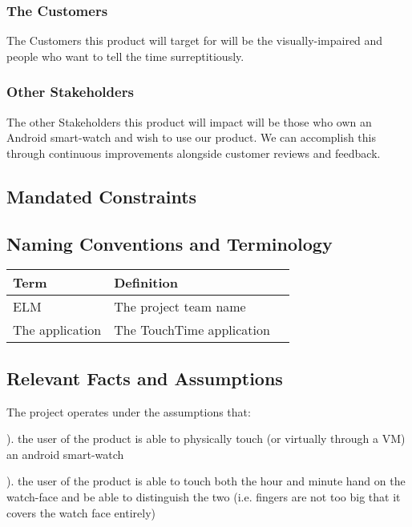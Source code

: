 \documentclass[12pt, titlepage]{article}
\begin{document}
\subsubsection{The Customers}

The Customers this product will target for will be the visually-impaired and people who want to tell the time surreptitiously.

\subsubsection{Other Stakeholders}

The other Stakeholders this product will impact will be those who own an Android smart-watch and wish to use our product. We can accomplish this through continuous improvements alongside customer reviews and feedback. 

\subsection{Mandated Constraints}

\subsection{Naming Conventions and Terminology}

\begin{center}
    \begin{tabular}{| l | l | p{5cm} | }
    \hline
    Term & Definition \\ \hline
    ELM & The project team name \\ \hline
    The application & The TouchTime application \\ \hline
    \end{tabular}
\end{center}

\subsection{Relevant Facts and Assumptions}
The project operates under the assumptions that:
\vspace{2mm}

). the user of the product is able to physically touch (or virtually through a VM) an android smart-watch

). the user of the product is able to touch both the hour and minute hand on the watch-face and be able to distinguish the two (i.e. fingers are not too big that it covers the watch face entirely)
\end{document}
